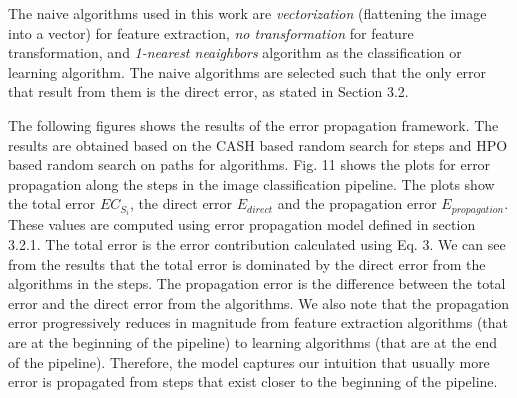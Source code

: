 The naive algorithms used in this work are \textit{vectorization} (flattening the image into a vector) for feature extraction, \textit{no transformation} for feature transformation, and \textit{1-nearest neaighbors} algorithm as the classification or learning algorithm. The naive algorithms are selected such that the only error that result from them is the direct error, as stated in Section 3.2.

The following figures shows the results of the error propagation framework. The results are obtained based on the CASH based random search for steps and HPO based random search on paths for algorithms. 
Fig. 11 shows the plots for error propagation along the steps in the image classification pipeline. The plots show the total error $EC_{S_i}$, the direct error $E_{direct}$ and the propagation error $E_{propagation}$. These values are computed using error propagation model defined in section 3.2.1.
The total error is the error contribution calculated using Eq. 3. We can see from the results that the total error is dominated by the direct error from the algorithms in the steps. The propagation error is the difference between the total error and the direct error from the algorithms. We also note that the propagation error progressively reduces in magnitude from feature extraction algorithms (that are at the beginning of the pipeline) to learning algorithms (that are at the end of the pipeline). Therefore, the model captures our intuition that usually more error is propagated from steps that exist closer to the beginning of the pipeline.

